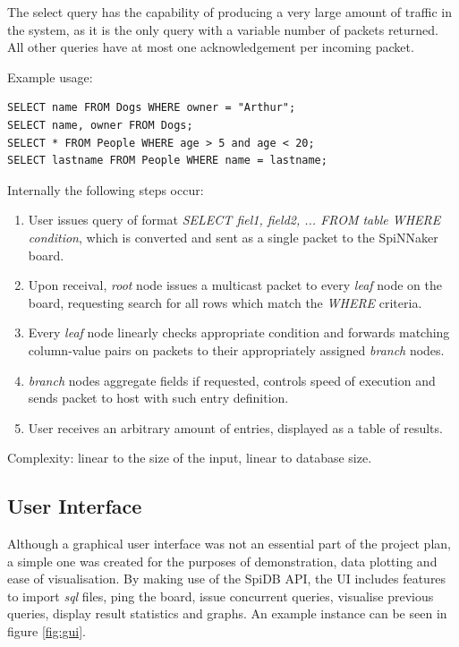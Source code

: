 The select query has the capability of producing a very large amount of traffic in the system, as it is the only query with a variable number of packets returned. All other queries have at most one acknowledgement per incoming packet. 

Example usage:
\begin{lstlisting}
SELECT name FROM Dogs WHERE owner = "Arthur";
SELECT name, owner FROM Dogs;
SELECT * FROM People WHERE age > 5 and age < 20;
SELECT lastname FROM People WHERE name = lastname;
\end{lstlisting}
   
Internally the following steps occur:
\begin{enumerate}
\item User issues query of format \textit{SELECT fiel1, field2, ... FROM table WHERE condition}, which is converted and sent as a single packet to the SpiNNaker board.
\item Upon receival, \textit{root} node issues a multicast packet to every \textit{leaf} node on the board, requesting search for all rows which match the \textit{WHERE} criteria.
\item Every \textit{leaf} node linearly checks appropriate condition and forwards matching column-value pairs on packets to their appropriately assigned \textit{branch} nodes.
\item \textit{branch} nodes aggregate fields if requested, controls speed of execution and sends packet to host with such entry definition.
\item User receives an arbitrary amount of entries, displayed as a table of results.
\end{enumerate}

Complexity: linear to the size of the input, linear to database size.
 
\subsection{User Interface} 
Although a graphical user interface was not an essential part of the project plan, a simple one was created for the purposes of demonstration, data plotting and ease of visualisation. By making use of the SpiDB API, the UI includes features to import \textit{sql} files, ping the board, issue concurrent queries, visualise previous queries, display result statistics and graphs. An example instance can be seen in figure \ref{fig:gui}.

